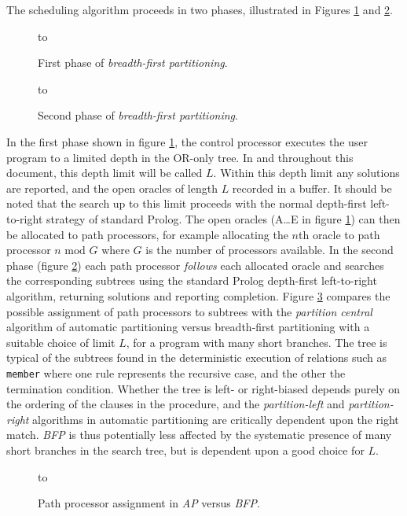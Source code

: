 \begin{itemize}
{  The scheduling algorithm proceeds in two phases, illustrated in Figures \ref{bfp_phase1}
  and \ref{bfp_phase2}.
\begin{figure}[h]
\vspace{5mm} \hbox to 
\caption{First phase of \textit{breadth-first partitioning}.}
\vspace{5mm}
\label{bfp_phase1}
\end{figure}
\begin{figure}[h]
\vspace{5mm} \hbox to 
\caption{Second phase of \textit{breadth-first partitioning}.}
\vspace{5mm}
\label{bfp_phase2}
\end{figure}
  In the first phase shown in figure \ref{bfp_phase1}, 
  the control processor executes the user program to a limited
  depth in the OR-only tree.  In \cite{Sar95} and throughout this document, this
  depth limit will be called $L$.  Within this depth limit any solutions are reported,
  and the open oracles of length $L$ recorded in a buffer.  It should be noted that
  the search up to this limit proceeds with the normal depth-first left-to-right
  strategy of standard Prolog.  The open oracles (A\ldots E in figure \ref{bfp_phase1})
  can then be allocated to path processors, for example allocating the $n$th oracle
  to path processor $n \mbox{ mod } G$ where $G$ is the number of processors available.
  In the second phase (figure \ref{bfp_phase2})
  each path processor \textit{follows} each allocated oracle and searches the
  corresponding subtrees using the standard Prolog depth-first left-to-right algorithm,
  returning solutions and reporting completion.  Figure \ref{bfp_vs_ap} compares the
  possible assignment of path processors to subtrees with the \textit{partition central}
  algorithm of automatic partitioning versus breadth-first partitioning with a suitable
  choice of limit $L$, for a program with many short branches.  The tree is typical of
  the subtrees found in the deterministic execution of relations such as \texttt{member}
  where one rule represents the recursive case, and the other the termination condition.
  Whether the tree is left- or right-biased depends purely on the ordering of
  the clauses in the procedure, and the \textit{partition-left} and \textit{partition-right}
  algorithms in automatic partitioning are critically dependent upon the right match.
  \textit{BFP} is thus potentially less affected by the systematic presence of many short
  branches in the search tree, but is dependent upon a good choice for $L$.
\begin{figure}[h]
\vspace{5mm} \hbox to 
\caption{Path processor assignment in \textit{AP} versus \textit{BFP}.}
\vspace{5mm}
\label{bfp_vs_ap}
\end{figure}

}
\end{itemize}
